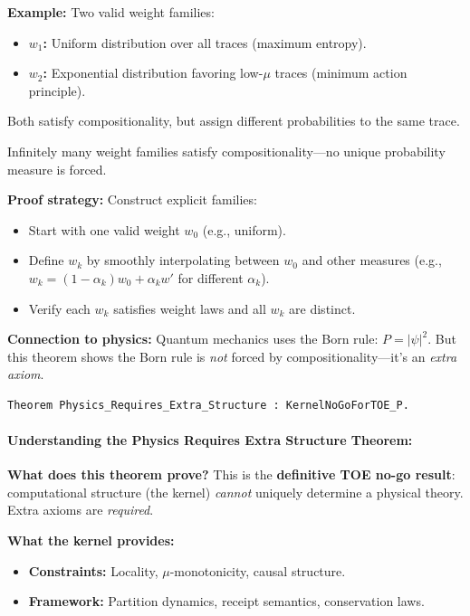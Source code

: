 \textbf{Example:} Two valid weight families:
\begin{itemize}
    \item \textbf{$w_1$:} Uniform distribution over all traces (maximum entropy).
    \item \textbf{$w_2$:} Exponential distribution favoring low-$\mu$ traces (minimum action principle).
\end{itemize}
Both satisfy compositionality, but assign different probabilities to the same trace.

Infinitely many weight families satisfy compositionality---no unique probability measure is forced.

\textbf{Proof strategy:} Construct explicit families:
\begin{itemize}
    \item Start with one valid weight $w_0$ (e.g., uniform).
    \item Define $w_k$ by smoothly interpolating between $w_0$ and other measures (e.g., $w_k = (1 - \alpha_k) w_0 + \alpha_k w'$ for different $\alpha_k$).
    \item Verify each $w_k$ satisfies weight laws and all $w_k$ are distinct.
\end{itemize}

\textbf{Connection to physics:} Quantum mechanics uses the Born rule: $P = |\psi|^2$. But this theorem shows the Born rule is \textit{not} forced by compositionality---it's an \textit{extra axiom}.


\begin{lstlisting}
Theorem Physics_Requires_Extra_Structure : KernelNoGoForTOE_P.
\end{lstlisting}

\paragraph{Understanding the Physics Requires Extra Structure Theorem:}

\textbf{What does this theorem prove?} This is the \textbf{definitive TOE no-go result}: computational structure (the kernel) \textit{cannot} uniquely determine a physical theory. Extra axioms are \textit{required}.

\textbf{What the kernel provides:}
\begin{itemize}
    \item \textbf{Constraints:} Locality, $\mu$-monotonicity, causal structure.
    \item \textbf{Framework:} Partition dynamics, receipt semantics, conservation laws.
\end{itemize}

